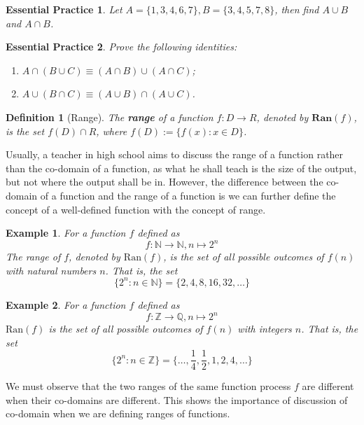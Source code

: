 \documentclass[12pt]{article}
\newtheorem{definition}{Definition}[section]
\newtheorem*{example}{Example}
\newtheorem{exercise}{Essential Practice}[subsection]
\begin{document}
    \begin{exercise}
        Let $A=\{1,3,4, 6, 7\}, B=\{3,4,5,7,8\}$, then find $A\cup B$ and $A\cap B$.
    \end{exercise}

    \begin{exercise}
        Prove the following identities:\begin{enumerate}
            \item $A\cap(B\cup C)\equiv (A\cap B)\cup(A\cap C)$;
            \item $A\cup(B\cap C)\equiv (A\cup B)\cap(A\cup C)$.
        \end{enumerate}
    \end{exercise}

    \begin{definition}[Range]
        The \textbf{range} of a function $f:D\to R$, denoted by $\mathbf{Ran}(f)$, is the set $f(D)\cap R$, where $f(D):=\{f(x):x\in D\}$.
    \end{definition}

    Usually, a teacher in high school aims to discuss the range of a function rather than the co-domain of a function, as what he shall teach is the size of the output, but not where the output shall be in. However, the difference between the co-domain of a function and the range of a function is we can further define the concept of a well-defined function with the concept of range.

    \begin{example}
        For a function $f$ defined as $$f:\mathbb{N}\to \mathbb{N}, n\mapsto 2^n$$ The range of $f$, denoted by $\mathrm{Ran}(f)$, is the set of all possible outcomes of $f(n)$ with natural numbers $n$. That is, the set $$\{2^n: n\in\mathbb{N}\}=\{2,4,8,16,32,\dots\}$$
    \end{example}

    \begin{example}
        For a function $f$ defined as $$f:\mathbb{Z}\to \mathbb{Q}, n\mapsto 2^n$$ $\mathrm{Ran}(f)$ is the set of all possible outcomes of $f(n)$ with integers $n$. That is, the set $$\{2^n: n\in\mathbb{Z}\}=\{\dots,\frac{1}{4},\frac{1}{2},1,2,4,\dots\}$$
    \end{example}

    We must observe that the two ranges of the same function process $f$ are different when their co-domains are different. This shows the importance of discussion of co-domain when we are defining ranges of functions.
\end{document}
